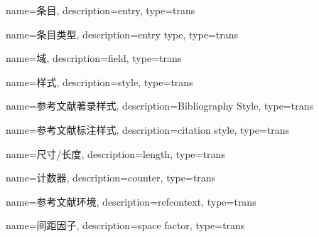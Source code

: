 {
name={条目},
description={entry},
type={trans}
}

{
name={条目类型},
description={entry type},
type={trans}
}

{
name={域},
description={field},
type={trans}
}

{
name={样式},
description={style},
type={trans}
}

{
name={参考文献著录样式},
description={Bibliography Style},
type={trans}
}

{
name={参考文献标注样式},
description={citation style},
type={trans}
}

{
name={尺寸/长度},
description={length},
type={trans}
}

{
name={计数器},
description={counter},
type={trans}
}

{
name={参考文献环境},
description={refcontext},
type={trans}
}

{
name={间距因子},
description={space factor},
type={trans}
}

